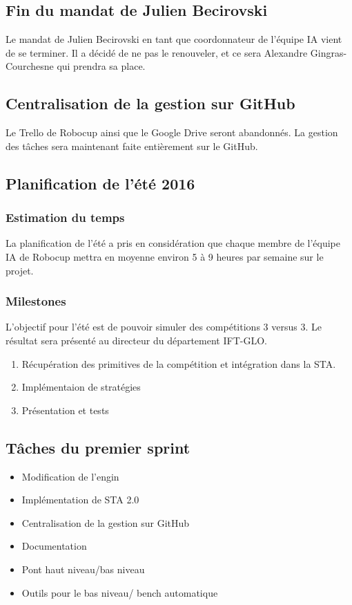 \documentclass[12pt,letterpaper,twoside]{article}
\begin{document}
\subsection*{Fin du mandat de Julien Becirovski}
Le mandat de Julien Becirovski en tant que coordonnateur de l'équipe IA vient de se terminer.
Il a décidé de ne pas le renouveler, et ce sera Alexandre Gingras-Courchesne qui prendra sa place.

\subsection*{Centralisation de la gestion sur GitHub}
Le Trello de Robocup ainsi que le Google Drive seront abandonnés.
La gestion des t\^aches sera maintenant faite enti\`erement sur le GitHub. 

\subsection*{Planification de l'été 2016}

\subsubsection*{Estimation du temps}
La planification de l'été a pris en considération que chaque membre de l'équipe IA de Robocup mettra en moyenne environ 5 à 9 heures par semaine sur le projet.

\subsubsection*{Milestones}
L'objectif pour l'été est de pouvoir simuler des compétitions 3 versus 3.
Le résultat sera présenté au directeur du département IFT-GLO.

\begin{enumerate}
\item Récupération des primitives de la compétition et intégration dans la STA.
\item Implémentaion de stratégies
\item Présentation et tests
\end{enumerate}

\subsection*{T\^aches du premier sprint}

\begin{itemize}
\item Modification de l'engin
\item Implémentation de STA 2.0
\item Centralisation de la gestion sur GitHub
\item Documentation
\item Pont haut niveau/bas niveau
\item Outils pour le bas niveau/ bench automatique
\end{itemize}
\end{document}
